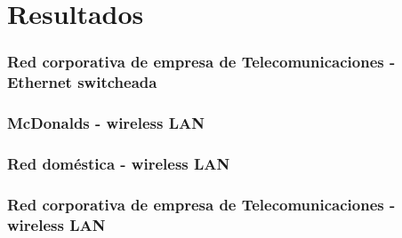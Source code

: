 \section{Resultados}\label{sec:resultados}
\subsubsection{Red corporativa de empresa de Telecomunicaciones - Ethernet switcheada}

\subsubsection{McDonalds - wireless LAN}


\subsubsection{Red doméstica - wireless LAN}

\subsubsection{Red corporativa de empresa de Telecomunicaciones - wireless LAN}